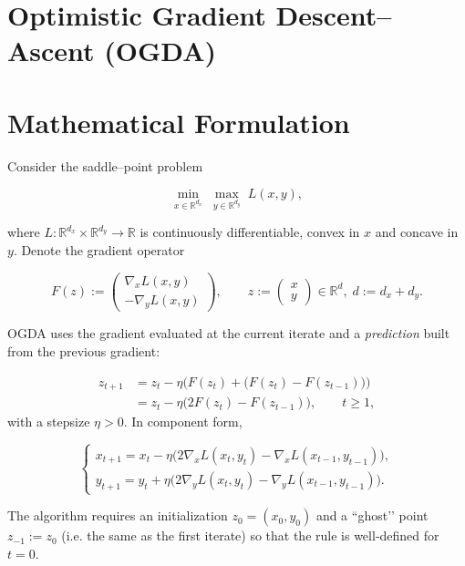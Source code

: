 \documentclass{article}
\begin{document}
\section*{Optimistic Gradient Descent–Ascent (OGDA)}

\section*{Mathematical Formulation}
Consider the saddle–point problem  

\[
\min_{x\in\mathbb{R}^{d_x}}\;\max_{y\in\mathbb{R}^{d_y}} \;L(x,y),
\]

where \(L:\mathbb{R}^{d_x}\times\mathbb{R}^{d_y}\to\mathbb{R}\) is continuously differentiable, convex in \(x\) and concave in \(y\).  
Denote the gradient operator  

\[
F(z):=
\begin{pmatrix}
\nabla_x L(x,y)\\[2mm]
-\nabla_y L(x,y)
\end{pmatrix},
\qquad 
z:=\begin{pmatrix}x\\y\end{pmatrix}\in\mathbb{R}^{d},\; d:=d_x+d_y .
\]

OGDA uses the gradient evaluated at the current iterate and a \emph{prediction} built from the previous gradient:

\[
\boxed{
\begin{aligned}
z_{t+1}
&=z_t-\eta\Big( F(z_t)+\big(F(z_t)-F(z_{t-1})\big)\Big)\\
&=z_t-\eta\big(2F(z_t)-F(z_{t-1})\big),
\qquad t\ge 1,
\end{aligned}}
\]
with a stepsize \(\eta>0\).  In component form,

\[
\begin{cases}
x_{t+1}=x_t-\eta\big(2\nabla_x L(x_t,y_t)-\nabla_x L(x_{t-1},y_{t-1})\big),\\[2mm]
y_{t+1}=y_t+\eta\big(2\nabla_y L(x_t,y_t)-\nabla_y L(x_{t-1},y_{t-1})\big).
\end{cases}
\]

The algorithm requires an initialization \(z_0=(x_0,y_0)\) and a “ghost’’ point
\(z_{-1}:=z_0\) (i.e. the same as the first iterate) so that the rule is well‑defined for \(t=0\).
\end{document}

